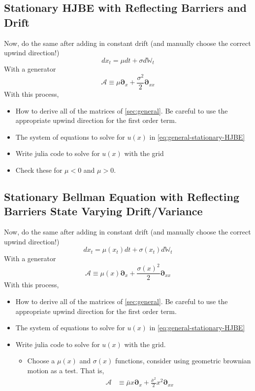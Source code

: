 \documentclass[11pt]{article}
\newcommand{\D}[1][]{\ensuremath{\boldsymbol{\partial}_{#1}}}
\newcommand{\W}{\ensuremath{\mathbb{W}}}
\newcommand{\A}{\ensuremath{\mathcal{A}}}
\begin{document}
\subsection{Stationary HJBE with Reflecting Barriers and Drift}
Now, do the same after adding in constant drift (and manually choose the correct upwind direction!)
$$
d x_t = \mu dt + \sigma d\W_t
$$
With a generator
$$
	\A \equiv \mu \D[x] + \frac{\sigma^2}{2}\D[xx]
$$
With this process,
\begin{itemize}
	\item How to derive all of the matrices of \cref{sec:general}.  Be careful to use the appropriate upwind direction for the first order term.
	\item The system of equations to solve for $u(x)$ in \cref{eq:general-stationary-HJBE}
	\item Write julia code to solve for $u(x)$ with the grid
	\item Check these for $\mu < 0$ and $\mu > 0$.
\end{itemize}



\subsection{Stationary Bellman Equation with Reflecting Barriers State Varying Drift/Variance}
Now, do the same after adding in constant drift (and manually choose the correct upwind direction!)
$$
d x_t = \mu(x_t) dt + \sigma(x_t) d\W_t
$$
With a generator
$$
\A \equiv \mu(x) \D[x] + \frac{\sigma(x)^2}{2}\D[xx]
$$
With this process,
\begin{itemize}
	\item How to derive all of the matrices of \cref{sec:general}.  Be careful to use the appropriate upwind direction for the first order term.
	\item The system of equations to solve for $u(x)$ in \cref{eq:general-stationary-HJBE}
	\item Write julia code to solve for $u(x)$ with the grid.
	\begin{itemize}
		\item Choose a $\mu(x)$ and $\sigma(x)$ functions, consider using geometric brownian motion as a test.  That is,
		\begin{align}
			\A &\equiv \bar{\mu} x \D[x] + \frac{\bar{\sigma}^2}{2}x^2\D[xx]
		\end{align}
	\end{itemize}
\end{itemize}
\end{document}
